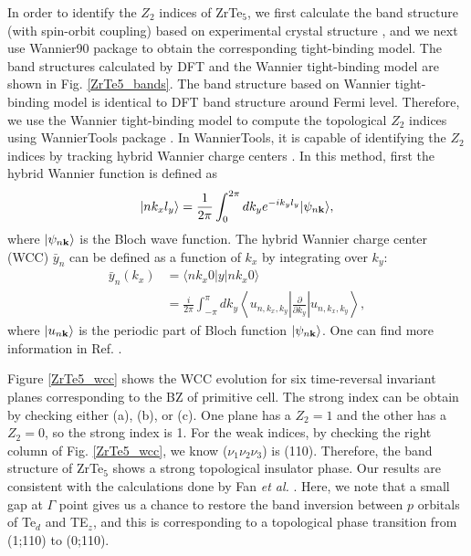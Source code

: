 In order to identify the $Z_2$ indices of ZrTe$_5$, we first calculate the band structure (with spin-orbit coupling) based on experimental crystal structure \cite{fjellvaag1986structural}, and we next use Wannier90 package \cite{wannier90} to obtain the corresponding tight-binding model. The band structures calculated by DFT and the Wannier tight-binding model are shown in Fig. \ref{ZrTe5_bands}. The band structure based on Wannier tight-binding model is identical to DFT band structure around Fermi level. Therefore, we use the Wannier tight-binding model to compute the topological $Z_2$ indices using WannierTools package \cite{wanniertools}. In WannierTools, it is capable of identifying the $Z_2$ indices by tracking hybrid Wannier charge centers \cite{PhysRevB.83.235401}. In this method, first the hybrid Wannier function is defined as 
	\begin{equation}
		\begin{aligned}
		|nk_xl_y\rangle =\frac{1}{2\pi} \int_0^{2\pi}d k_y e^{-ik_yl_y}|\psi_{n{\bold k}}\rangle,
		\end{aligned}
	\end{equation}
where $|\psi_{n{\bold k}}\rangle$ is the Bloch wave function. The hybrid Wannier charge center (WCC) $\bar{y}_n$ can be defined as a function of $k_x$ by integrating over $k_y$:
	\begin{equation}
		\begin{aligned}
		 \bar{y}_n(k_x)&=  \langle nk_x0|y|n k_x0\rangle \\
            &=\frac{i}{2\pi} \int _{-\pi} ^{\pi}d {k_y} \left \langle u_{n,k_x, k_y} \left| \frac{\partial}{\partial k_y} \right| u_{n,k_x, k_y}\right \rangle,
		\end{aligned}
	\end{equation}
where $| u_{n{\bf k}}\rangle$ is the periodic part of Bloch function $|\psi_{n{\bf k}}\rangle$. One can find more information in Ref. \cite{wanniertools}.

Figure \ref{ZrTe5_wcc} shows the WCC evolution for six time-reversal invariant planes corresponding to the BZ of primitive cell. The strong index can be obtain by checking either (a), (b), or (c). One plane has a $Z_2 = 1$ and the other has a $Z_2 = 0$, so the strong index is 1. For the weak indices, by checking the right column of Fig. \ref{ZrTe5_wcc}, we know ($\nu_1\nu_2\nu_3$) is (110). Therefore, the band structure of ZrTe$_5$ shows a strong topological insulator phase. Our results are consistent with the calculations done by Fan {\it et al.} \cite{fan2017transition}. Here, we note that a small gap at $\Gamma$ point gives us a chance to restore the band inversion between $p$ orbitals of Te$_d$ and TE$_z$, and this is corresponding to a topological phase transition from (1;110) to (0;110). 

